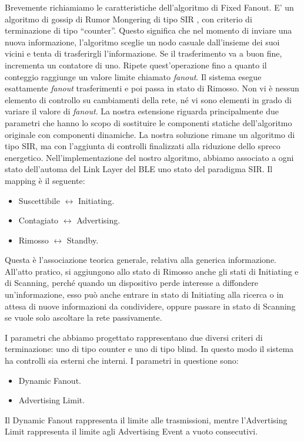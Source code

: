 Brevemente richiamiamo le caratteristiche dell'algoritmo di Fixed Fanout. E' un algoritmo di gossip di Rumor Mongering di tipo \acf{SIR} , con criterio di terminazione di tipo “counter”. Questo significa che nel momento di inviare una nuova informazione, l'algoritmo sceglie un nodo casuale dall'insieme dei suoi vicini e tenta di trasferirgli l'informazione. Se il trasferimento va a buon fine, incrementa un contatore di uno. Ripete quest'operazione fino a quanto il conteggio raggiunge un valore limite chiamato \textit{fanout}. Il sistema esegue esattamente \textit{fanout} trasferimenti e poi passa in stato di Rimosso. Non vi è nessun elemento di controllo su cambiamenti della rete, né vi sono elementi in grado di variare il valore di \textit{fanout}. La nostra estensione riguarda principalmente due parametri che hanno lo scopo di sostituire le componenti statiche dell'algoritmo originale con componenti dinamiche. La nostra soluzione rimane un algoritmo di tipo \acs{SIR}, ma con l'aggiunta di controlli finalizzati alla riduzione dello spreco energetico. Nell'implementazione del nostro algoritmo, abbiamo associato a ogni stato dell'automa del Link Layer del BLE uno stato del paradigma SIR. Il mapping è il seguente:
\begin{itemize}
	\item Suscettibile $ \longleftrightarrow $ Initiating.
	\item Contagiato $ \longleftrightarrow $ Advertising.
	\item Rimosso $ \longleftrightarrow $ Standby.
\end{itemize}
Questa è l'associazione teorica generale, relativa alla generica informazione. All'atto pratico, si aggiungono allo stato di Rimosso anche gli stati di Initiating e di Scanning, perché quando un dispositivo perde interesse a diffondere un'informazione, esso può anche entrare in stato di Initiating alla ricerca o in attesa di nuove informazioni da condividere, oppure passare in stato di Scanning se vuole solo ascoltare la rete passivamente.

I parametri che abbiamo progettato rappresentano due diversi criteri di terminazione: uno di tipo counter e uno di tipo blind. In questo modo il sistema ha controlli sia esterni che interni. I parametri in questione sono:
\begin{itemize}
	\item Dynamic Fanout.
	\item Advertising Limit.
\end{itemize}
Il Dynamic Fanout rappresenta il limite alle trasmissioni, mentre l'Advertising Limit rappresenta il limite agli Advertising Event a vuoto consecutivi.

